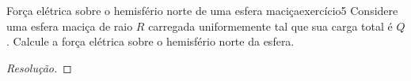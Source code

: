\begin{exercício}{Força elétrica sobre o hemisfério norte de uma esfera maciça}{exercício5}
    Considere uma esfera maciça de raio \(R\) carregada uniformemente tal que sua carga total é \(Q\). Calcule a força elétrica sobre o hemisfério norte da esfera.
\end{exercício}
\begin{proof}[Resolução]

\end{proof}

